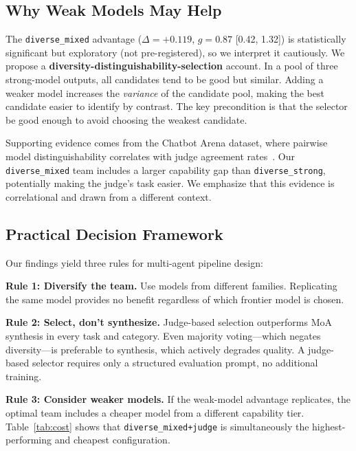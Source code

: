 \documentclass[10pt,twocolumn]{article}
\theoremstyle{remark}
\begin{document}
\subsection{Why Weak Models May Help}
\label{sec:whyweak}

The \texttt{diverse\_mixed} advantage ($\Delta = +0.119$, $g = 0.87$ [0.42, 1.32]) is statistically significant but exploratory (not pre-registered), so we interpret it cautiously. We propose a \textbf{diversity-distinguishability-selection} account. In a pool of three strong-model outputs, all candidates tend to be good but similar. Adding a weaker model increases the \emph{variance} of the candidate pool, making the best candidate easier to identify by contrast. The key precondition is that the selector be good enough to avoid choosing the weakest candidate.

Supporting evidence comes from the Chatbot Arena dataset, where pairwise model distinguishability correlates with judge agreement rates~\cite{chiang2024chatbot}. Our \texttt{diverse\_mixed} team includes a larger capability gap than \texttt{diverse\_strong}, potentially making the judge's task easier. We emphasize that this evidence is correlational and drawn from a different context.

\subsection{Practical Decision Framework}
\label{sec:practical}

Our findings yield three rules for multi-agent pipeline design:

\textbf{Rule 1: Diversify the team.} Use models from different families. Replicating the same model provides no benefit regardless of which frontier model is chosen.

\textbf{Rule 2: Select, don't synthesize.} Judge-based selection outperforms MoA synthesis in every task and category. Even majority voting---which negates diversity---is preferable to synthesis, which actively degrades quality. A judge-based selector requires only a structured evaluation prompt, no additional training.

\textbf{Rule 3: Consider weaker models.} If the weak-model advantage replicates, the optimal team includes a cheaper model from a different capability tier. Table~\ref{tab:cost} shows that \texttt{diverse\_mixed+judge} is simultaneously the highest-performing and cheapest configuration.
\end{document}
